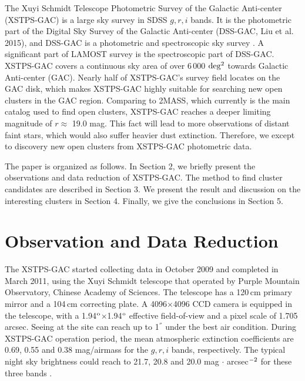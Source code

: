 \documentclass[]{raa_rb}
\begin{document}
The Xuyi Schmidt Telescope Photometric Survey of the Galactic Anti-center (XSTPS-GAC) is a large sky survey in SDSS $g,r,i$ bands.  It is the photometric part of the Digital Sky Survey of the Galactic Anti-center (DSS-GAC, Liu et al. 2015), and DSS-GAC is a photometric and spectroscopic sky survey \citep{xiaowei2013}. A significant part of LAMOST survey \citep{gang2012} is the spectroscopic part of DSS-GAC. XSTPS-GAC covers a continuous sky area of over 6\,000 $\rm deg^2$ towards Galactic Anti-center (GAC). Nearly half of XSTPS-GAC's survey field locates on the GAC disk, which makes XSTPS-GAC highly suitable for searching new open clusters in the GAC region. Comparing to 2MASS, which currently is the main catalog used to find open clusters, XSTPS-GAC reaches a deeper limiting magnitude of $r \approx$ 19.0 mag. This fact will lead to more observations of distant faint stars, which would also suffer heavier dust extinction.  Therefore, we except to discovery new open clusters from XSTPS-GAC photometric data.

The paper is organized as follows.  In Section 2, we briefly present the
observations and data reduction of XSTPS-GAC.  The method to find cluster
candidates are described in Section 3.  We present the result and discussion on the
interesting clusters in Section 4.  Finally, we give the conclusions in Section
5. 


\section{Observation and Data Reduction}
\label{sec2}
The XSTPS-GAC started collecting data in October 2009 and completed in March 2011, using the Xuyi Schmidt telescope that operated by Purple Mountain Observatory, Chinese Academy of Sciences. The telescope has a 120\,cm primary mirror and a 104\,cm correcting plate.  A 4096$\times$4096 CCD camera is equipped in the telescope, with a 1.94$^{\rm o}$$\times$1.94$^{\rm o}$ effective field-of-view and a pixel scale of 1.705 arcsec. Seeing at the site can reach up to 1$^{''}$ under the best air condition.  During XSTPS-GAC operation period, the mean atmospheric extinction coefficients are 0.69, 0.55 and 0.38 mag/airmass for the $g,r,i$ bands, respectively. The typical night sky brightness could reach to 21.7, 20.8 and 20.0 mag $\cdot$ arcsec$^{\rm -2}$ for these three bands \citep{zhang2013}.
\end{document}
